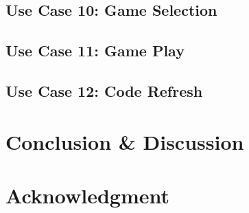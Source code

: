 \documentclass[conference]{IEEEtran}
\begin{document}
    \subsection{Use Case 10: Game Selection}
    \subsection{Use Case 11: Game Play}
    \subsection{Use Case 12: Code Refresh}
\section{Conclusion \& Discussion}

\section*{Acknowledgment}
\end{document}
